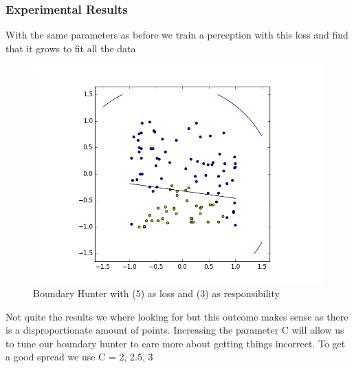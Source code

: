 \documentclass{article}
\theoremstyle{definition}
\begin{document}
\subsubsection{Experimental Results}

With the same parameters as before we train a perception with this loss and find that it grows to fit all the data

\begin{figure}[H]
\centering
  \begin{minipage}[b]{0.4\textwidth}
    \includegraphics[width=\textwidth]{BoundaryHunter-Attempt3-01.png}
    \caption{Boundary Hunter with (5) as loss and (3) as responsibility}
  \end{minipage}
  \hfill
\end{figure}

Not quite the results we where looking for but this outcome makes sense as there is a disproportionate amount of points. Increasing the parameter C will allow us to tune our boundary hunter to care more about getting things incorrect. To get a good spread we use C = 2, 2.5, 3
\end{document}
